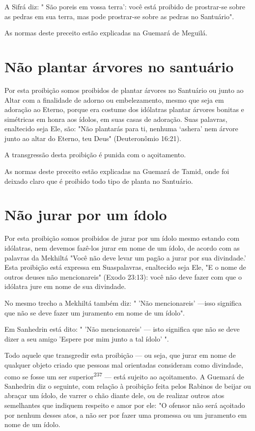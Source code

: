 \begin{itemize}
\begin{enumrate}
\begin{itemize}
\begin{itemize}
\begin{itemize}
A Sifrá diz: " São poreis em vossa terra': você está proibido de
prostrar-se sobre as pedras em sua terra, mas pode prostrar-se sobre as
pedras no Santuário".


As normas deste preceito estão explicadas na Guemará de Meguilá.

\section{Não plantar árvores no santuário}

Por esta proibição somos proibidos de plantar árvores no Santuário ou
junto ao Altar com a finalidade de adorno ou embelezamento, mesmo que
seja em adoração ao Eterno, porque era costume dos idólatras plantar
árvores bonitas e simétricas em honra aos ídolos, em suas casas de
adoração. Suas pala­vras, enaltecido seja Ele, são: "Não plantarás para
ti, nenhuma `ashera' nem ár­vore junto ao altar do Eterno, teu Deus"
(Deuteronômio 16:21).

A transgressão desta proibição é punida com o açoitamento.

As normas deste preceito estão explicadas na Guemará de Tamid, onde foi
deixado claro que é proibido todo tipo de planta no Santuário.

\section{Não jurar por um ídolo}

Por esta proibição somos proibidos de jurar por um ídolo mesmo estando
com idólatras, nem devemos fazê-los jurar em nome de um ídolo, de acordo
com as palavras da Mekhiltá "Você não deve levar um pagão a jurar por
sua divindade.' Esta proibição está expressa em Suaspalavras, enaltecido
seja Ele, "E o nome de outros deuses não mencionareis" (Exodo 23:13):
você não deve fazer com que o idólatra jure em nome de sua divindade.

No mesmo trecho a Mekhiltá também diz: " 'Não mencionareis' ---isso
significa que não se deve fazer um juramento em nome de um ídolo".

Em Sanhedrin está dito: " 'Não mencionareis' --- isto significa que não
se deve dizer a seu amigo 'Espere por mim junto a tal ídolo' ".

Todo aquele que transgredir esta proibição --- ou seja, que jurar em
nome de qualquer objeto criado que pessoas mal orientadas consideram
como divindade, como se fosse um ser superior\textsuperscript{237} ---
está sujeito ao açoitamento. A Guemará de Sanhedrin diz o seguinte, com
relação à proibição feita pelos Rabi­nos de beijar ou abraçar um ídolo,
de varrer o chão diante dele, ou de realizar outros atos semelhantes que
indiquem respeito e amor por ele: "O ofensor não será açoitado por
nenhum desses atos, a não ser por fazer uma promessa ou um juramento em
nome de um ídolo.



\end{itemize}
\end{itemize}
\end{itemize}
\end{enumrate}
\end{itemize}
